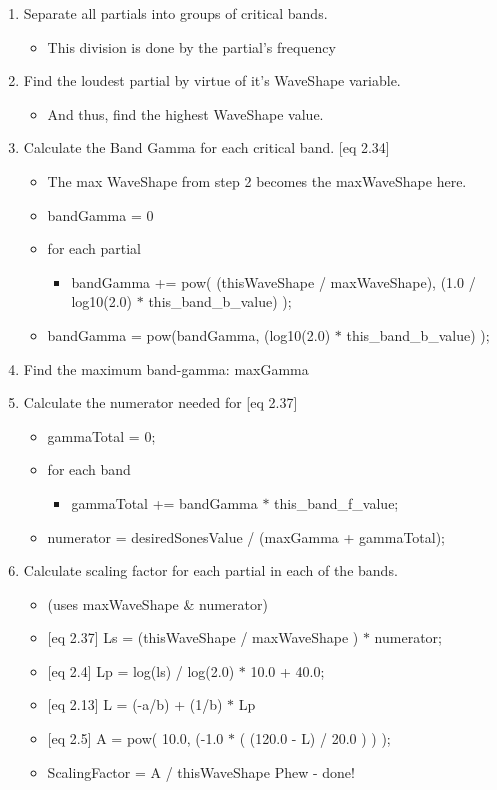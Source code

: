 \begin{enumerate}
\item Separate all partials into groups of critical bands.\begin{itemize}
\item This division is done by the partial's frequency\end{itemize}
\item Find the loudest partial by virtue of it's Wave\-Shape variable.\begin{itemize}
\item And thus, find the highest Wave\-Shape value.\end{itemize}
\item Calculate the Band Gamma for each critical band. \mbox{[}eq 2.34\mbox{]}\begin{itemize}
\item The max Wave\-Shape from step 2 becomes the max\-Wave\-Shape here.\item band\-Gamma = 0\item for each partial\begin{itemize}
\item band\-Gamma += pow( (this\-Wave\-Shape / max\-Wave\-Shape), (1.0 / log10(2.0) $\ast$ this\_\-band\_\-b\_\-value) );\end{itemize}
\item band\-Gamma = pow(band\-Gamma, (log10(2.0) $\ast$ this\_\-band\_\-b\_\-value) );\end{itemize}
\item Find the maximum band-gamma: max\-Gamma\item Calculate the numerator needed for \mbox{[}eq 2.37\mbox{]}\begin{itemize}
\item gamma\-Total = 0;\item for each band\begin{itemize}
\item gamma\-Total += band\-Gamma $\ast$ this\_\-band\_\-f\_\-value;\end{itemize}
\item numerator = desired\-Sones\-Value / (max\-Gamma + gamma\-Total);\end{itemize}
\item Calculate scaling factor for each partial in each of the bands.\begin{itemize}
\item (uses max\-Wave\-Shape \& numerator)\item \mbox{[}eq 2.37\mbox{]} Ls = (this\-Wave\-Shape / max\-Wave\-Shape ) $\ast$ numerator;\item \mbox{[}eq 2.4\mbox{]} Lp = log(ls) / log(2.0) $\ast$ 10.0 + 40.0;\item \mbox{[}eq 2.13\mbox{]} L = (-a/b) + (1/b) $\ast$ Lp\item \mbox{[}eq 2.5\mbox{]} A = pow( 10.0, (-1.0 $\ast$ ( (120.0 - L) / 20.0 ) ) );\item Scaling\-Factor = A / this\-Wave\-Shape Phew - done! \begin{Desc}

\end{Desc}
\end{itemize}
\end{enumerate}
